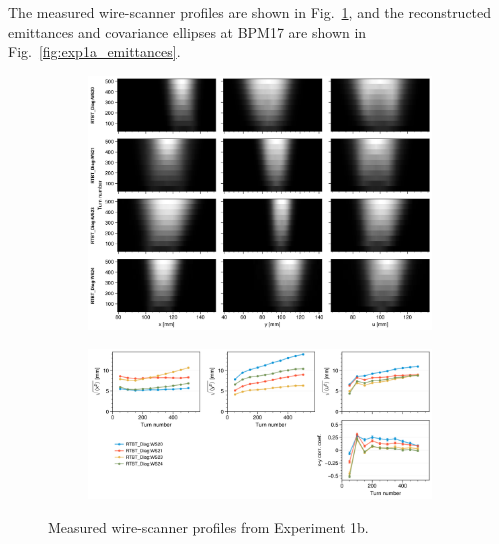 The measured wire-scanner profiles are shown in Fig.~\ref{fig:exp1b_wsmeas}, and the reconstructed emittances and covariance ellipses at BPM17 are shown in Fig.~\ref{fig:exp1a_emittances}.
%
\begin{figure}[!p]
    \centering
    \begin{subfigure}{\textwidth}
        \includegraphics[width=\textwidth]{Images/chapter5/exp1b/waterfall.png}
    \end{subfigure}
    \vfill
    \vspace*{1.25cm}
    \vfill
    \begin{subfigure}{\textwidth}
        \includegraphics[width=\textwidth]{Images/chapter5/exp1b/rms.png}
    \end{subfigure}
    \caption{Measured wire-scanner profiles from Experiment 1b.}
    \label{fig:exp1b_wsmeas}
\end{figure}
%
%
